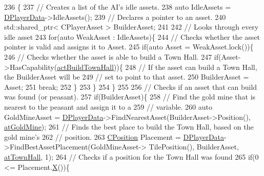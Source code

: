 \begin{DoxyCode}
236                                                            \{
237     \textcolor{comment}{// Creates a list of the AI's idle assets.}
238     \textcolor{keyword}{auto} IdleAssets = \hyperlink{classCAIPlayer_a83b5113c8f7e80df54940b647c5ee2e6}{DPlayerData}->IdleAssets();
239     \textcolor{comment}{// Declares a pointer to an asset.}
240     std::shared\_ptr< CPlayerAsset > BuilderAsset;
241     
242     \textcolor{comment}{// Looks through every idle asset}
243     \textcolor{keywordflow}{for}(\textcolor{keyword}{auto} WeakAsset : IdleAssets)\{
244         \textcolor{comment}{// Checks whether the asset pointer is valid and assigns it to Asset.}
245         \textcolor{keywordflow}{if}(\textcolor{keyword}{auto} Asset = WeakAsset.lock())\{
246             \textcolor{comment}{// Checks whether the asset is able to build a Town Hall.}
247             \textcolor{keywordflow}{if}(Asset->HasCapability(\hyperlink{GameDataTypes_8h_a35b98ce26aca678b03c6f9f76e4778cea0b5f001e8c77b8a87998da6320595498}{actBuildTownHall}))\{
248                 \textcolor{comment}{// If the asset can build a Town Hall, the BuilderAsset will be }
249                 \textcolor{comment}{// set to point to that asset.}
250                 BuilderAsset = Asset;
251                 \textcolor{keywordflow}{break};
252             \}
253         \}
254     \}
255 
256     \textcolor{comment}{// Checks if an asset that can build was found (or peasant).}
257     \textcolor{keywordflow}{if}(BuilderAsset)\{
258         \textcolor{comment}{// Find the gold mine that is nearest to the peasant and assign it to a}
259         \textcolor{comment}{// variable.}
260         \textcolor{keyword}{auto} GoldMineAsset = \hyperlink{classCAIPlayer_a83b5113c8f7e80df54940b647c5ee2e6}{DPlayerData}->FindNearestAsset(BuilderAsset->Position(), 
      \hyperlink{GameDataTypes_8h_a5600d4fc433b83300308921974477feca243d9ba44092eadd561db058d742b3b3}{atGoldMine});
261         \textcolor{comment}{// Finds the best place to build the Town Hall, based on the gold mine's}
262         \textcolor{comment}{// position.}
263         \hyperlink{classCPosition}{CPosition} Placement = \hyperlink{classCAIPlayer_a83b5113c8f7e80df54940b647c5ee2e6}{DPlayerData}->FindBestAssetPlacement(GoldMineAsset->
      TilePosition(), BuilderAsset, \hyperlink{GameDataTypes_8h_a5600d4fc433b83300308921974477feca5c0fa8a0f367f3358365536d3c7aa321}{atTownHall}, 1);
264         \textcolor{comment}{// Checks if a position for the Town Hall was found}
265         \textcolor{keywordflow}{if}(0 <= Placement.\hyperlink{classCPosition_a9a6b94d3b91df1492d166d9964c865fc}{X}())\{

\end{DoxyCode}
